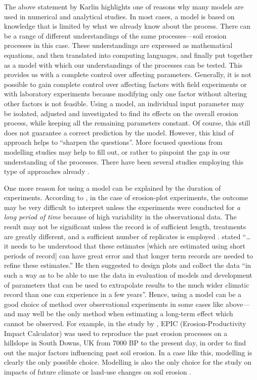The above statement by Karlin highlights one of reasons why many models are used
in numerical and analytical studies. In most cases, a model is based on
knowledge that is limited by what we already know about the process. There can
be a range of different understandings of the same processes---soil erosion
processes in this case. These understandings are expressed as mathematical
equations, and then translated into computing languages, and finally put
together as a model with which our understandings of the processes can be
tested. This provides us with a complete control over affecting parameters.
Generally, it is not possible to gain complete control over affecting factors
with field experiments or with laboratory experiments because modifying only
one factor without altering other factors is not feasible. Using a model, an
individual input parameter may be isolated, adjusted and investigated to find
its effects on the overall erosion process, while keeping all the remaining
parameters constant. Of course, this still does not guarantee a correct
prediction by the model. However, this kind of approach helps to ``sharpen the
questions''. More focused questions from modelling studies may help to fill out,
or rather to pinpoint the gap in our understanding of the processes. There have
been several studies employing this type of approaches already
\citep{favis-mortlock1995-365,favis-mortlock1999-329,pruski2002-7,
nearing2005-131}.

One more reason for using a model can be explained by the duration of
experiments. According to \citet{web_[Se-list]}, in the case of erosion-plot
experiments, the outcome may be very difficult to interpret unless the
experiments were conducted for \emph{a long period of time} because of high
variability in the observational data. The result may not be significant unless
the record is of sufficient length, treatments are greatly different, and a
sufficient number of replicates is employed \citep{nearing1999-1829}.
\citet{web_[Se-list]} stated ``\ldots it needs to be understood that these
estimates [which are estimated using short periods of record] can have great
error and that longer term records are needed to refine these estimates.'' He
then suggested to design plots and collect the data ``in such a way as to be
able to use the data in evaluation of models and development of parameters that
can be used to extrapolate results to the much wider climatic record than one
can experience in a few years''.
Hence, using a model can be a good choice of method over observational
experiments in some cases like above---and may well be the only method when
estimating a long-term effect which cannot be observed. For example, in the
study by \citet{favis-mortlock1997-79}, EPIC (Erosion-Productivity Impact
Calculator) was used to reproduce the past erosion processes on a hillslope in
South Downs, UK from 7000 BP to the present day, in order to find out the major
factors influencing past soil erosion. In a case like this, modelling is clearly
the only possible choice. Modelling is also the only choice for the study on
impacts of future climate or land-use changes on soil erosion
\citep{favis-mortlock1995-365,favis-mortlock1999-329,pruski2002-7,
pruski2002-climate,nearing2005-131}.

